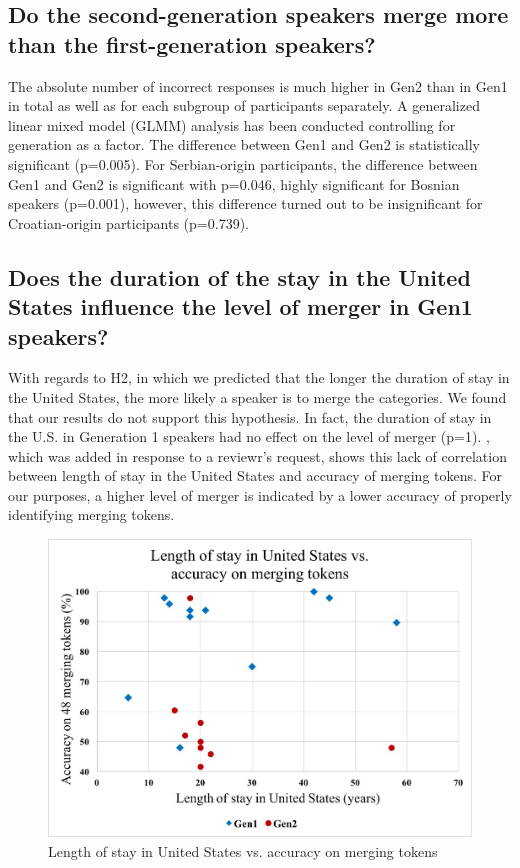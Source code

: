 \documentclass[output=paper,modfonts,nonflat,
]{langsci/langscibook}
\begin{document}
\subsection{Do the second-generation speakers merge more than the first-generation speakers?}\label{sec:mihajlovic:5.2}

The absolute number of incorrect responses is much higher in Gen2 than in Gen1 in total as well as for each subgroup of participants separately. A generalized linear mixed model (GLMM) analysis has been conducted controlling for generation as a factor. The difference between Gen1 and Gen2 is statistically significant (p=0.005). For Serbian-origin participants, the difference between Gen1 and Gen2 is significant with p=0.046, highly significant for Bosnian speakers (p=0.001), however, this difference turned out to be insignificant for Croatian-origin participants (p=0.739).


\subsection{Does the duration of the stay in the United States influence the level of merger in Gen1 speakers?}\label{sec:mihajlovic:5.3}

With regards to H2, in which we predicted that the longer the duration of stay in the United States, the more likely a speaker is to merge the categories. We found that our results do not support this hypothesis. In fact, the duration of stay in the U.S. in Generation 1 speakers had no effect on the level of merger (p=1). , which was added in response to a reviewr’s request, shows this lack of correlation between length of stay in the United States and accuracy of merging tokens. For our purposes, a higher level of merger is indicated by a lower accuracy of properly identifying merging tokens.

\begin{figure}
\includegraphics[height=.3\textheight]{figures/M_C_Figure 5.jpg}
\caption{\label{fig:mihajlovic:5} Length of stay in United States vs. accuracy on merging tokens}
\end{figure}
\end{document}
